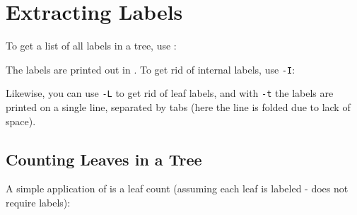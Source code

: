 

\section{Extracting Labels}
\label{sct_labels}

To get a list of all labels in a tree, use :

\begin{samepage}


\end{samepage}

\noindent{}The labels are printed out in \no. To get rid of internal labels,
use \texttt{-I}:

\begin{samepage}


\end{samepage}

\noindent{}Likewise, you can use \texttt{-L} to get rid of leaf labels, and
with \texttt{-t} the labels are printed on a single line, separated by tabs
(here the line is folded due to lack of space).

\begin{samepage}


\end{samepage}

\subsection{Counting Leaves in a Tree}
\label{sct_counting_leaves}

A simple application of  is a leaf count (assuming each leaf is
labeled - \nw{} does not require labels):

\begin{samepage}


\end{samepage}

